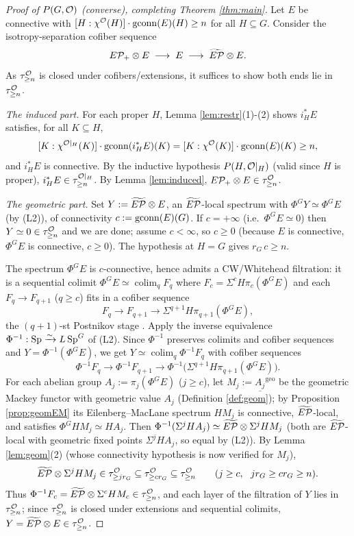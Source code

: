 \begin{proof}[Proof of $P(G,\mathcal{O})$ (converse), completing Theorem \ref{thm:main}]
Let $E$ be connective with $[H:\chi^{\mathcal{O}}(H)]\cdot\operatorname{gconn}(E)(H)\ge n$ for all
$H\subseteq G$. Consider the isotropy-separation cofiber sequence
\[
E\mathcal P_+\otimes E\;\longrightarrow\; E\;\longrightarrow\;\widetilde{E\mathcal P}\otimes E .
\]
As $\tau^{\mathcal{O}}_{\ge n}$ is closed under cofibers/extensions, it suffices to show
both ends lie in $\tau^{\mathcal{O}}_{\ge n}$.

\emph{The induced part.} For each proper $H$, Lemma \ref{lem:restr}(1)-(2) shows
$i_H^\ast E$ satisfies, for all $K\subseteq H$,
\[
[K:\chi^{\mathcal{O}|_H}(K)]\cdot\operatorname{gconn}(i_H^\ast E)(K)
=[K:\chi^{\mathcal{O}}(K)]\cdot\operatorname{gconn}(E)(K)\ge n ,
\]
and $i_H^\ast E$ is connective. By the inductive hypothesis $P(H,\mathcal{O}|_H)$ (valid
since $H$ is proper), $i_H^\ast E\in\tau^{\mathcal{O}|_H}_{\ge n}$. By Lemma
\ref{lem:induced}, $E\mathcal P_+\otimes E\in\tau^{\mathcal{O}}_{\ge n}$.

\emph{The geometric part.} Set $Y:=\widetilde{E\mathcal P}\otimes E$, an $\widetilde{E\mathcal P}$-local spectrum with
$\Phi^G Y\simeq\Phi^G E$ (by (L2)), of connectivity $c:=\operatorname{gconn}(E)(G)$. If
$c=+\infty$ (i.e.\ $\Phi^G E\simeq 0$) then $Y\simeq 0\in\tau^{\mathcal{O}}_{\ge n}$ and we are
done; assume $c<\infty$, so $c\ge 0$ (because $E$ is connective, $\Phi^G E$ is
connective, $c\ge0$). The hypothesis at $H=G$ gives $r_G\,c\ge n$.

The spectrum $\Phi^G E$ is $c$-connective, hence admits a CW/Whitehead filtration:
it is a sequential colimit $\Phi^G E\simeq\operatorname*{colim}_q F_q$ where
$F_c=\Sigma^c H\pi_c(\Phi^G E)$ and each $F_{q}\to F_{q+1}$ ($q\ge c$) fits in a
cofiber sequence
\[
F_q\longrightarrow F_{q+1}\longrightarrow \Sigma^{q+1}H\pi_{q+1}(\Phi^G E),
\]
the $(q+1)$-st Postnikov stage \cite[\S2]{HillPrimer}. Apply the inverse
equivalence $\Phi^{-1}:\mathrm{Sp}\xrightarrow{\sim}L\,\mathrm{Sp}^G$ of (L2). Since $\Phi^{-1}$
preserves colimits and cofiber sequences and $Y=\Phi^{-1}(\Phi^G E)$, we get
$Y\simeq\operatorname*{colim}_q\Phi^{-1}F_q$ with cofiber sequences
\[
\Phi^{-1}F_q\longrightarrow\Phi^{-1}F_{q+1}\longrightarrow
\Phi^{-1}\bigl(\Sigma^{q+1}H\pi_{q+1}(\Phi^G E)\bigr).
\]
For each abelian group $A_j:=\pi_j(\Phi^G E)$ ($j\ge c$), let
$M_j:=\underline{A_j}^{\mathrm{geo}}$ be the geometric Mackey functor with
geometric value $A_j$ (Definition \ref{def:geom}); by Proposition
\ref{prop:geomEM} its Eilenberg--MacLane spectrum $HM_j$ is connective,
$\widetilde{E\mathcal P}$-local, and satisfies $\Phi^G HM_j\simeq HA_j$. Then
$\Phi^{-1}(\Sigma^j HA_j)\simeq\widetilde{E\mathcal P}\otimes\Sigma^j HM_j$ (both are $\widetilde{E\mathcal P}$-local with
geometric fixed points $\Sigma^j HA_j$, so equal by (L2)). By Lemma
\ref{lem:geom}(2) (whose connectivity hypothesis is now verified for $M_j$),
\[
\widetilde{E\mathcal P}\otimes\Sigma^j HM_j\in\tau^{\mathcal{O}}_{\ge j r_G}\subseteq\tau^{\mathcal{O}}_{\ge c r_G}
\subseteq\tau^{\mathcal{O}}_{\ge n}\qquad(j\ge c,\ \ j r_G\ge c r_G\ge n).
\]
Thus $\Phi^{-1}F_c=\widetilde{E\mathcal P}\otimes\Sigma^c HM_c\in\tau^{\mathcal{O}}_{\ge n}$, and each layer of
the filtration of $Y$ lies in $\tau^{\mathcal{O}}_{\ge n}$; since $\tau^{\mathcal{O}}_{\ge n}$ is closed
under extensions and sequential colimits, $Y=\widetilde{E\mathcal P}\otimes E\in\tau^{\mathcal{O}}_{\ge n}$.


\end{proof}

